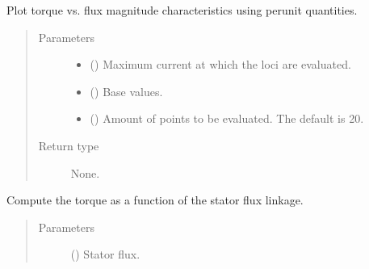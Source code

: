 \documentclass[letterpaper,10pt,english]{sphinxmanual}
\begin{document}
\begin{fulllineitems}
\begin{fulllineitems}
\label{\detokenize{control.sm:control.sm.torque.TorqueCharacteristics.plot_torque_flux}}
\pysigstartsignatures
{}
\pysigstopsignatures
\sphinxAtStartPar
Plot torque vs. flux magnitude characteristics using per\sphinxhyphen{}unit
quantities.
\begin{quote}\begin{description}
\item[{Parameters}] \leavevmode\begin{itemize}
\item {} 
\sphinxAtStartPar
{} () \textendash{} Maximum current at which the loci are evaluated.

\item {} 
\sphinxAtStartPar
{} () \textendash{} Base values.

\item {} 
\sphinxAtStartPar
{} (\sphinxstyleliteralemphasis{\sphinxupquote{, }}) \textendash{} Amount of points to be evaluated. The default is 20.

\end{itemize}

\item[{Return type}] \leavevmode
\sphinxAtStartPar
None.

\end{description}\end{quote}

\end{fulllineitems}


\begin{fulllineitems}
\label{\detokenize{control.sm:control.sm.torque.TorqueCharacteristics.torque}}
\pysigstartsignatures
{}
\pysigstopsignatures
\sphinxAtStartPar
Compute the torque as a function of the stator flux linkage.
\begin{quote}\begin{description}
\item[{Parameters}] \leavevmode
\sphinxAtStartPar
{} () \textendash{} Stator flux.


\end{description}
\end{quote}
\end{fulllineitems}
\end{fulllineitems}
\end{document}
